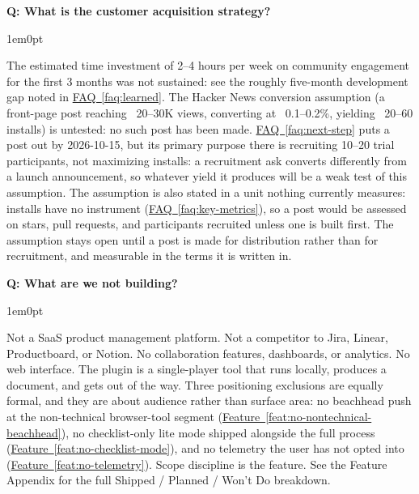 \documentclass[11pt,letterpaper]{article}
\newcounter{faqnum}
\newenvironment{faqpair}[1]{%
  \needspace{4\baselineskip}%
  \vspace{0.5em}%
  \refstepcounter{faqnum}%
  \noindent\textbf{\color{SectionBlue}Q\thefaqnum: #1}\par\nopagebreak[4]%
  \vspace{0.2em}%
  \begin{adjustwidth}{1em}{0pt}%
  \setlength{\parindent}{0pt}%
}{%
  \end{adjustwidth}%
  \vspace{0.5em}%
}
\newcommand{\faqref}[1]{\hyperref[#1]{FAQ~\ref*{#1}}}
\newcommand{\featureref}[1]{\hyperref[#1]{Feature~\ref*{#1}}}
\begin{document}
\begin{faqpair}{What is the customer acquisition strategy?}
  The estimated time investment of 2--4 hours per week on community engagement for the first 3 months was not sustained: see the roughly five-month development gap noted in \faqref{faq:learned}. The Hacker News conversion assumption (a front-page post reaching ~20--30K views, converting at ~0.1--0.2\%, yielding ~20--60 installs) is untested: no such post has been made. \faqref{faq:next-step} puts a post out by 2026-10-15, but its primary purpose there is recruiting 10--20 trial participants, not maximizing installs: a recruitment ask converts differently from a launch announcement, so whatever yield it produces will be a weak test of this assumption. The assumption is also stated in a unit nothing currently measures: installs have no instrument (\faqref{faq:key-metrics}), so a post would be assessed on stars, pull requests, and participants recruited unless one is built first. The assumption stays open until a post is made for distribution rather than for recruitment, and measurable in the terms it is written in.
\end{faqpair}

\begin{faqpair}{What are we not building?}
  Not a SaaS product management platform. Not a competitor to Jira, Linear, Productboard, or Notion. No collaboration features, dashboards, or analytics. No web interface. The plugin is a single-player tool that runs locally, produces a document, and gets out of the way. Three positioning exclusions are equally formal, and they are about audience rather than surface area: no beachhead push at the non-technical browser-tool segment (\featureref{feat:no-nontechnical-beachhead}), no checklist-only lite mode shipped alongside the full process (\featureref{feat:no-checklist-mode}), and no telemetry the user has not opted into (\featureref{feat:no-telemetry}). Scope discipline is the feature. See the Feature Appendix for the full Shipped / Planned / Won't Do breakdown.
\end{faqpair}
\end{document}
